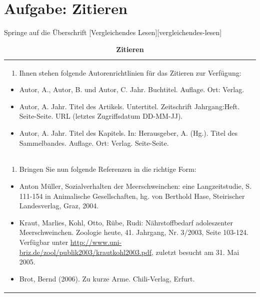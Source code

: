 \documentclass[]{book}
\providecommand{\tightlist}{%
  \setlength{\itemsep}{0pt}\setlength{\parskip}{0pt}}
\theoremstyle{definition}
\theoremstyle{definition}
\theoremstyle{definition}
\theoremstyle{remark}
\begin{document}
\section{Aufgabe: Zitieren}\label{aufgabe-zitieren}

Springe auf die Überschrift {[}Vergleichendes
Lesen{]}{[}vergleichendes-lesen{]}

\begin{longtable}[]{@{}l@{}}
\caption{\textbf{\label{tab:aufgabe7-test} Zitieren}}\tabularnewline
\toprule
\begin{minipage}[t]{0.97\columnwidth}\raggedright\strut
\begin{enumerate}
\def\labelenumi{\arabic{enumi}.}
\tightlist
\item
  Ihnen stehen folgende Autorenrichtlinien für das Zitieren zur
  Verfügung:
\end{enumerate}

\begin{itemize}
\tightlist
\item
  Autor, A., Autor, B. und Autor, C. Jahr. Buchtitel. Auflage. Ort:
  Verlag.
\item
  Autor, A. Jahr. Titel des Artikels. Untertitel. Zeitschrift
  Jahrgang:Heft. Seite-Seite. URL (letztes Zugriffsdatum DD-MM-JJ).
\item
  Autor, A. Jahr. Titel des Kapitels. In: Herausgeber, A. (Hg.). Titel
  des Sammelbandes. Auflage. Ort: Verlag. Seite-Seite. \vspace{-6mm}
\end{itemize}\strut
\end{minipage}\tabularnewline
\begin{minipage}[t]{0.97\columnwidth}\raggedright\strut
\begin{enumerate}
\def\labelenumi{\arabic{enumi}.}
\setcounter{enumi}{1}
\tightlist
\item
  Bringen Sie nun folgende Referenzen in die richtige Form:
\end{enumerate}

\begin{itemize}
\tightlist
\item
  Anton Müller, Sozialverhalten der Meerschweinchen: eine
  Langzeitstudie, S. 111-154 in Animalische Gesellschaften, hg. von
  Berthold Hase, Steirischer Landesverlag, Graz, 2004.
\item
  Kraut, Marlies, Kohl, Otto, Rübe, Rudi: Nährstoffbedarf adoleszenter
  Meerschweinchen. Zoologie heute, 41. Jahrgang, Nr. 3/2003, Seite
  103-124. Verfügbar unter
  \url{http://www.uni-briz.de/zool/publik2003/krautkohl2003.pdf},
  zuletzt besucht am 31. Mai 2005.
\item
  Brot, Bernd (2006). Zu kurze Arme. Chili-Verlag, Erfurt.
\end{itemize}\strut
\end{minipage}\tabularnewline
\bottomrule
\end{longtable}


\end{document}
